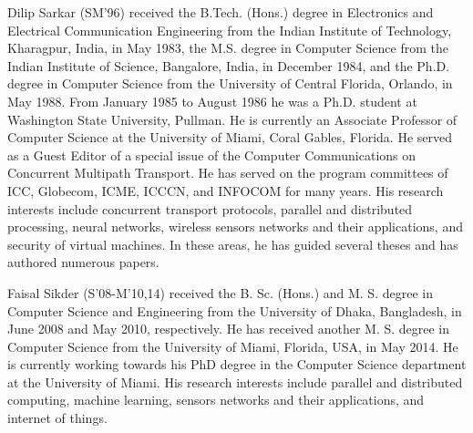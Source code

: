 \documentclass[]{IEEEtran}
\begin{document}



\begin{IEEEbiography}
{Dilip Sarkar} 
(SM'96) received the B.Tech. (Hons.) degree in Electronics and Electrical Communication Engineering from the Indian Institute of Technology, Kharagpur, India, in May 1983, the M.S. degree in Computer Science from the Indian Institute of Science, Bangalore, India, in December 1984, and the Ph.D. degree in Computer Science from the University of Central Florida, Orlando, in May 1988. From January 1985 to August 1986 he was a Ph.D. student at Washington State University, Pullman. He is currently an Associate Professor of Computer Science at the University of Miami, Coral Gables, Florida. 
He served as a Guest Editor of a special issue of the Computer Communications on Concurrent Multipath Transport. He has served on the program committees of ICC, Globecom, ICME, ICCCN, and INFOCOM for many years. His research interests include concurrent transport protocols, parallel and distributed processing, neural networks, wireless sensors networks and their applications, and security of virtual machines. In these areas, he has guided several theses and has authored numerous papers.
\end{IEEEbiography}
\begin{IEEEbiography}{Faisal Sikder} 
 (S'08-M'10,14) received the B. Sc. (Hons.) and M. S. degree in Computer Science and Engineering from the
University of Dhaka, Bangladesh, in June 2008 and May 2010, respectively. He has received another M. S. degree
in Computer Science from the University of Miami, Florida, USA, in May 2014. He is currently working towards his PhD 
degree in the Computer Science department at the University of Miami. His research interests include parallel and 
distributed computing, machine learning, sensors networks and their applications, and internet of things.
\end{IEEEbiography}
\vfill
\end{document}
